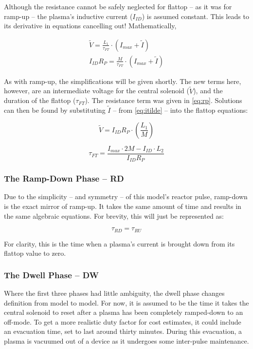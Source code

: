 Although the resistance cannot be safely neglected for flattop -- as it was for ramp-up -- the plasma's inductive current ($I_{ID}$) is assumed constant. This leads to its derivative in equations cancelling out! Mathematically,

\begin{align}
	\tilde V = \frac{L_1}{\tau_{FT}} \cdot \left( I_{max} + \tilde I \right) \\
	I_{ID} R_P = \frac{M}{\tau_{FT}} \cdot \left( I_{max} + \tilde I \right)
\end{align}

As with ramp-up, the simplifications will be given shortly. The new terms here, however, are an intermediate voltage for the central solenoid ($\tilde V$), and the duration of the flattop ($\tau_{FT}$). The resistance term was given in \cref{eq:rp}. Solutions can then be found by substituting $\tilde I$ -- from \cref{eq:itilde} -- into the flattop equations:

\begin{equation}
	\tilde V = I_{ID} R_P \cdot \left( \frac{L_1}{M} \right)	
\end{equation}

\begin{equation}
	\label{eq:tauft}
	\tau_{FT} = \frac{ I_{max} \cdot 2 M - I_{ID} \cdot  L_2 }{I_{ID} R_P}
\end{equation}

\subsubsection{The Ramp-Down Phase -- RD}

Due to the simplicity -- and symmetry -- of this model's reactor pulse, ramp-down is the exact mirror of ramp-up. It takes the same amount of time and results in the same algebraic equations. For brevity, this will just be represented as:

\begin{equation}
	\label{eq:taurd}
	\tau_{RD} = \tau_{RU}
\end{equation}

For clarity, this is the time when a plasma's current is brought down from its flattop value to zero.

\subsubsection{The Dwell Phase -- DW}

Where the first three phases had little ambiguity, the dwell phase changes definition from model to model. For now, it is assumed to be the time it takes the central solenoid to reset after a plasma has been completely ramped-down to an off-mode. To get a more realistic duty factor for cost estimates, it could include an evacuation time, set to last around thirty minutes. During this evacuation, a plasma is vacuumed out of a device as it undergoes some inter-pulse maintenance.

